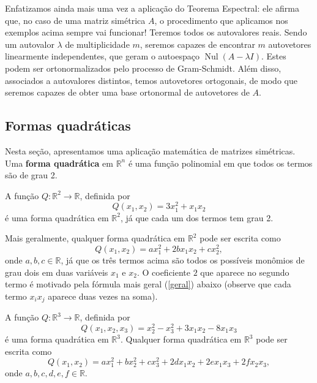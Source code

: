 \documentclass[../livro.tex]{subfiles}
\begin{document}
Enfatizamos ainda mais uma vez a aplicação do Teorema Espectral: ele afirma que, no caso de uma matriz simétrica $A$, o procedimento que aplicamos nos exemplos acima sempre vai funcionar! Teremos todos os autovalores reais. Sendo um autovalor $\lambda$ de multiplicidade $m$, seremos capazes de encontrar $m$ autovetores linearmente independentes, que geram o autoespaço $\operatorname{Nul} (A - \lambda I)$. Estes podem ser ortonormalizados pelo processo de Gram-Schmidt. Além disso, associados a autovalores distintos, temos autovetores ortogonais, de modo que seremos capazes de obter uma base ortonormal de autovetores de $A$.


\subsection{Formas quadráticas}


Nesta seção, apresentamos uma aplicação matemática de matrizes simétricas. Uma \textbf{forma quadrática} em $\mathbb{R}^n$ é uma função polinomial em que todos os termos são de grau 2.

\begin{example}\label{exemplo1}
	A função $Q : \mathbb{R}^2 \to \mathbb{R}$, definida por 
	\begin{equation}
	Q(x_1, x_2) = 3 x_1^2 + x_1x_2
	\end{equation} é uma forma quadrática em $\mathbb{R}^2$, já que cada um dos termos tem grau 2.
	
	Mais geralmente, qualquer forma quadrática em $\mathbb{R}^2$ pode ser escrita como
	\begin{equation}
	Q(x_1, x_2) = a x_1^2 + 2 b x_1x_2 + cx_2^2,
	\end{equation} onde $a,b,c \in \mathbb{R}$, já que os três termos acima são todos os possíveis monômios de grau dois em duas variáveis $x_1$ e $x_2$. O coeficiente $2$ que aparece no segundo termo é motivado pela fórmula mais geral (\ref{geral}) abaixo (observe que cada termo $x_i x_j$ aparece duas vezes na soma).
\end{example}




\begin{example}\label{exemplo2}
	A função $Q : \mathbb{R}^3 \to \mathbb{R}$, definida por 
	\begin{equation}
	Q(x_1, x_2, x_3) = x_2^2 - x_3^2 + 3 x_1 x_2 - 8 x_1 x_3
	\end{equation} é uma forma quadrática em $\mathbb{R}^3$. Qualquer forma quadrática em $\mathbb{R}^3$ pode ser escrita como
	\begin{equation}
	Q(x_1, x_2) = a x_1^2 + b x_2^2 + cx_3^2 + 2 dx_1x_2 +2  ex_1x_3 +2  fx_2x_3,
	\end{equation} onde $a,b,c, d, e, f \in \mathbb{R}$.
\end{example}
\end{document}
